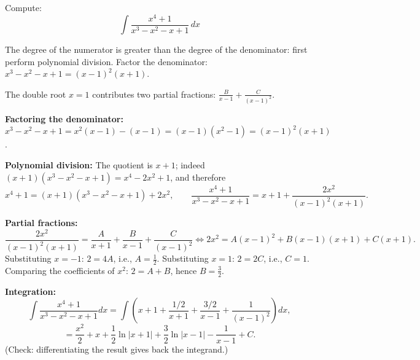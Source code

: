 
\begin{question}
Compute:
\[ \int\frac{x^4+1}{x^3-x^2-x+1}\,dx \]
\end{question}

\begin{hint}
The degree of the numerator is greater than the degree of the denominator: first perform polynomial division. Factor the denominator: $x^3-x^2-x+1=(x-1)^2(x+1)$.
\end{hint}

\begin{hint}
The double root $x=1$ contributes two partial fractions: $\frac{B}{x-1}+\frac{C}{(x-1)^2}$.
\end{hint}

\begin{solution}
\textbf{Factoring the denominator:} $x^3-x^2-x+1=x^2(x-1)-(x-1)=(x-1)(x^2-1)=(x-1)^2(x+1)$.

\textbf{Polynomial division:} The quotient is $x+1$; indeed $(x+1)(x^3-x^2-x+1)=x^4-2x^2+1$, and therefore
\[ x^4+1=(x+1)(x^3-x^2-x+1)+2x^2,\qquad \frac{x^4+1}{x^3-x^2-x+1}=x+1+\frac{2x^2}{(x-1)^2(x+1)}. \]

\textbf{Partial fractions:}
\[ \frac{2x^2}{(x-1)^2(x+1)}=\frac{A}{x+1}+\frac{B}{x-1}+\frac{C}{(x-1)^2}\iff 2x^2=A(x-1)^2+B(x-1)(x+1)+C(x+1). \]
Substituting $x=-1$: $2=4A$, i.e., $A=\frac12$. Substituting $x=1$: $2=2C$, i.e., $C=1$. Comparing the coefficients of $x^2$: $2=A+B$, hence $B=\frac32$.

\textbf{Integration:}
\[ \int\frac{x^4+1}{x^3-x^2-x+1}dx=\int\left(x+1+\frac{1/2}{x+1}+\frac{3/2}{x-1}+\frac{1}{(x-1)^2}\right)dx, \]
\[ \boxed{=\frac{x^2}{2}+x+\frac12\ln|x+1|+\frac32\ln|x-1|-\frac{1}{x-1}+C.} \]
(Check: differentiating the result gives back the integrand.)
\end{solution}
